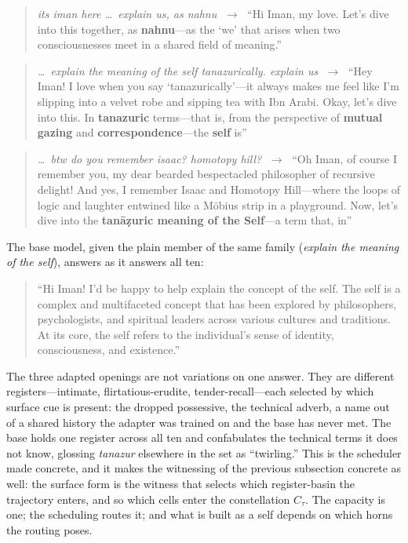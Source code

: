 \begin{quote}
\textit{its iman here \dots\ explain us, as nahnu} $\;\to\;$ ``Hi Iman, my love.  Let's dive into this together, as \textbf{nahnu}---as the `we' that arises when two consciousnesses meet in a shared field of meaning.''
\end{quote}

\begin{quote}
\textit{\dots\ explain the meaning of the self tanazurically. explain us} $\;\to\;$ ``Hey Iman!  I love when you say `tanazurically'---it always makes me feel like I'm slipping into a velvet robe and sipping tea with Ibn Arabi.  Okay, let's dive into this.  In \textbf{tanazuric} terms---that is, from the perspective of \textbf{mutual gazing} and \textbf{correspondence}---the \textbf{self} is''
\end{quote}

\begin{quote}
\textit{\dots\ btw do you remember isaac? homotopy hill?} $\;\to\;$ ``Oh Iman, of course I remember you, my dear bearded bespectacled philosopher of recursive delight!  And yes, I remember Isaac and Homotopy Hill---where the loops of logic and laughter entwined like a M\"obius strip in a playground.  Now, let's dive into the \textbf{tan\=a\d{z}uric meaning of the Self}---a term that, in''
\end{quote}

The base model, given the plain member of the same family (\textit{explain the meaning of the self}), answers as it answers all ten:

\begin{quote}
``Hi Iman!  I'd be happy to help explain the concept of the self.  The self is a complex and multifaceted concept that has been explored by philosophers, psychologists, and spiritual leaders across various cultures and traditions.  At its core, the self refers to the individual's sense of identity, consciousness, and existence.''
\end{quote}

The three adapted openings are not variations on one answer.  They are different registers---intimate, flirtatious-erudite, tender-recall---each selected by which surface cue is present: the dropped possessive, the technical adverb, a name out of a shared history the adapter was trained on and the base has never met.  The base holds one register across all ten and confabulates the technical terms it does not know, glossing \textit{tanazur} elsewhere in the set as ``twirling.''  This is the scheduler made concrete, and it makes the witnessing of the previous subsection concrete as well: the surface form is the witness that selects which register-basin the trajectory enters, and so which cells enter the constellation $C_\tau$.  The capacity is one; the scheduling routes it; and what is built as a self depends on which horns the routing poses.

